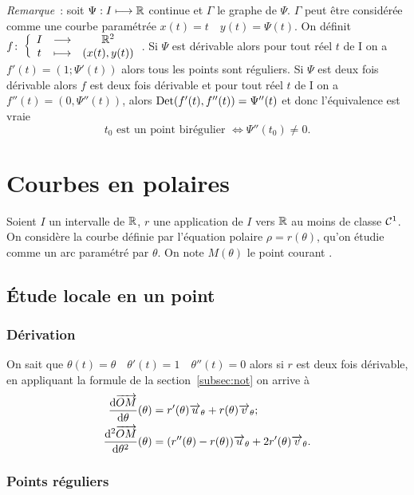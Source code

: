 \emph{Remarque}~:
soit \(\Psi : I \longmapsto \mathbb{R}\) continue et \(\Gamma\) le graphe de \(\Psi\).  
\(\Gamma\) peut être considérée comme une courbe paramétrée \(x(t)=t \quad 
y(t)=\Psi(t)\). On définit \(f\colon\left\{\begin{array}{ccc}I & \longrightarrow &\mathbb{R}^2\\t & \longmapsto & (x(t),y(t))\end{array}\right.\). Si 
\(\Psi\) est dérivable alors pour tout réel \(t\) de I on a 
\(f'(t)=(1;\Psi'(t))\) alors tous les points sont réguliers. Si \(\Psi\) est 
deux fois dérivable alors \(f\) est deux fois dérivable et pour tout réel \(t\) 
de I on a \(f''(t)=(0, \Psi''(t))\), alors \(\operatorname{Det}(f'(t),f''(t))=\Psi''(t)\) et 
donc l'équivalence est vraie
\begin{equation}
  t_0 \text{~est un point birégulier } \iff \Psi''(t_0) \neq 0.
\end{equation}

\section{Courbes en polaires}

Soient \(I\) un intervalle de \(\mathbb{R}\), \(r\) une application de \(I\) vers \(\mathbb{R}\) au 
moins de classe \(\mathcal{C}^{1}\). On considère la courbe définie par l'équation 
polaire \(\rho = r(\theta)\), qu'on étudie comme un arc paramétré par 
\(\theta\). On note \(M(\theta)\) le point \og courant \fg{}.

\subsection{Étude locale en un point}

\subsubsection{Dérivation}

On sait que \(\theta(t)=\theta \quad \theta'(t)=1 \quad \theta''(t)=0\) alors si 
\(r\) est deux fois dérivable, en appliquant la formule de la 
section~\ref{subsec:not} on arrive à
\begin{align}
  \dfrac{\mathrm{d} \overrightarrow{OM}}{\mathrm{d} \theta}(\theta)&=r'(\theta) \overrightarrow{u}_\theta + r(\theta) 
  \overrightarrow{v}_\theta;\\
  \dfrac{\mathrm{d}^2 \overrightarrow{OM}}{\mathrm{d} {\theta}^2}(\theta)&=(r''(\theta)-r(\theta)) \overrightarrow{u}_\theta + 
  2r'(\theta) \overrightarrow{v}_\theta.
\end{align}

\subsubsection{Points réguliers}

